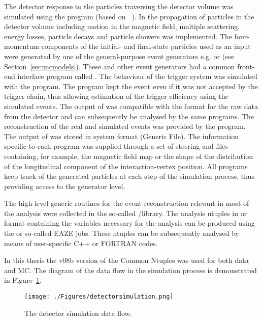 The detector response to the particles traversing the detector volume was simulated using the \mozart program (based on ~\cite{tech:cern-dd-ee-84-1}). In \mozart the propagation of particles in the detector volume including motion in the magnetic field, multiple scattering, energy losses, particle decays and particle showers was implemented. The four-momentum components of the initial- and final-state particles used as an input were generated by one of the general-purpose event generators e.g. \lepto or \ariadne (see Section~\ref{sec:mcmodels}). These and other event generators had a common front-end interface program called \amadeus. The behaviour of the trigger system was simulated with the \zgana program. The \zgana program kept the event even if it was not accepted by the trigger chain, thus allowing estimation of the trigger efficiency using the simulated events. The output of \zgana was compatible with the format for the raw data from the detector and can subsequently be analysed by the same programs. The reconstruction of the real and simulated events was provided by the \zephyr program. The output of \zephyr was stored in \adamo system format \gaf (Generic \adamo File). The information specific to each program was supplied through a set of steering and \gaf files containing, for example, the magnetic field map or the shape of the distribution of the longitudinal component of the interaction-vertex position. All programs keep track of the generated particles at each step of the simulation process, thus providing access to the generator level.

The high-level generic routines for the event reconstruction relevant in most of the analysis were collected in the so-called \orange/\PHANTOM library. The analysis ntuples in \paw or \rootpaw format containing the variables necessary for the analysis can be produced using the \orange or so-called EAZE jobs. These ntuples can be subsequently analysed by means of user-specific C++ or FORTRAN codes. 

In this thesis the v08b version of the Common Ntuples was used for both data and MC. The diagram of the data flow in the simulation process is demonstrated in Figure~\ref{fig:detectorsimulation}.

\begin{figure}[p]
	\centering
		\texttt{[image: ./Figures/detectorsimulation.png]}
	\caption{The \zeus detector simulation data flow.}
	\label{fig:detectorsimulation}
\end{figure}
